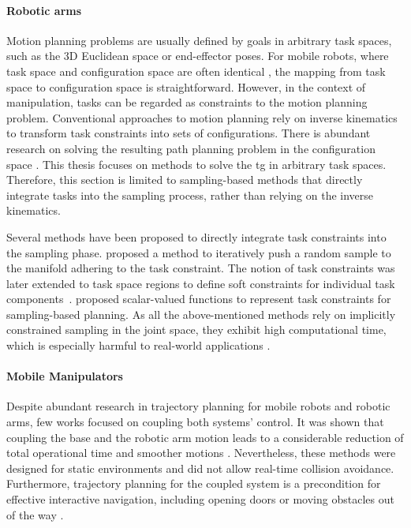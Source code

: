 \paragraph{Robotic arms}%

Motion planning problems are usually defined by goals in
arbitrary task spaces, such as the 3D Euclidean space or
end-effector poses. For mobile robots, where task space and
configuration space are often identical \cite{LaValle2006},
the mapping from task space to configuration space is
straightforward. However, in the context of manipulation,
tasks can be regarded as constraints to the motion planning
problem. Conventional approaches to motion planning rely on
inverse kinematics to transform task constraints into sets
of configurations. There is abundant research on
solving the resulting path planning problem in the
configuration space \cite{LaValle2006,Rickert2014}. This
thesis focuses on methods to solve the \ac{tg} in arbitrary
task spaces. Therefore, this section is limited to
sampling-based methods that directly integrate tasks into
the sampling process, rather than relying on the inverse
kinematics.

Several methods have been proposed to
directly integrate task constraints into the sampling phase.
\cite{Stilman2010} proposed a method to iteratively push a
random sample to the manifold adhering to the task
constraint. The notion of task constraints was later
extended to task space regions to define soft constraints
for individual task components~\cite{Berenson2011}.
\cite{Kingston2019} proposed scalar-valued functions to
represent task constraints for sampling-based planning. As
all the above-mentioned methods rely on implicitly
constrained sampling in the joint space, they exhibit high
computational time, which is especially harmful to
real-world applications \cite{qureshi2021constrained}.

\paragraph{Mobile Manipulators}

Despite abundant research in trajectory planning for mobile robots and robotic
arms, few works focused on coupling both systems' control. It was shown that
coupling the base and the robotic arm motion leads to a considerable reduction
of total operational time and smoother motions \cite{Thakar2018, Thakar2019}.
Nevertheless, these methods were designed for static environments and did not
allow real-time collision avoidance. Furthermore, trajectory planning for the
coupled system is a precondition for effective interactive navigation, including
opening doors \cite{Jain2009, Chitta2010} or moving obstacles out of the way
\cite{Li2019}.

